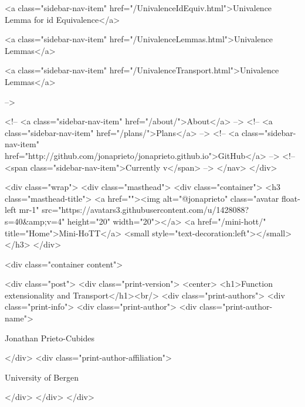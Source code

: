       
    
      
        
          <a class="sidebar-nav-item" href="/UnivalenceIdEquiv.html">Univalence Lemma for id Equivalence</a>
        
      
    
      
        
          <a class="sidebar-nav-item" href="/UnivalenceLemmas.html">Univalence Lemmas</a>
        
      
    
      
        
          <a class="sidebar-nav-item" href="/UnivalenceTransport.html">Univalence Lemmas</a>
        
      
     -->

    <!-- <a class="sidebar-nav-item" href="/about/">About</a> -->
    <!-- <a class="sidebar-nav-item" href="/plans/">Plans</a> -->
    <!-- <a class="sidebar-nav-item" href="http://github.com/jonaprieto/jonaprieto.github.io">GitHub</a> -->
    <!-- <span class="sidebar-nav-item">Currently v</span> -->
  </nav>
</div>

    <div class="wrap">
      <div class="masthead">
        <div class="container">
          <h3 class="masthead-title">
            <a href=""><img alt="@jonaprieto" class="avatar float-left mr-1" src="https://avatars3.githubusercontent.com/u/1428088?s=40&amp;v=4" height="20" width="20"></a>
            <a href="/mini-hott/" title="Home">Mini-HoTT</a>
            <small style="text-decoration:left"></small>
          </h3>
        </div>
      
      <div class="container content">
        







<div class="post">
  <div class="print-version">
    <center>
      <h1>Function extensionality and Transport</h1><br/>
        <div class="print-authors">
          <div class="print-info">
            <div class="print-author">
              <div class="print-author-name">
                
                  Jonathan Prieto-Cubides
                
              </div>
              <div class="print-author-affiliation">
                
                  University of Bergen
                
                </div>
            </div>
          </div>
          
